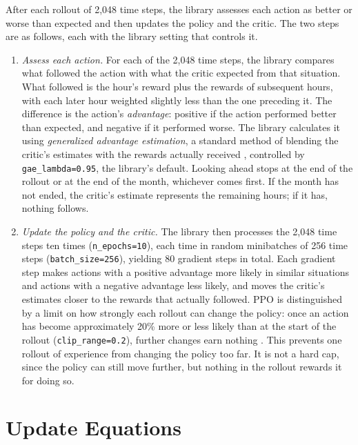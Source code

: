 \documentclass{UNCC-thesis}
\begin{document}
After each rollout of 2,048 time steps, the library assesses each action as better or worse
than expected and then updates the policy and the critic. The two steps are as follows, each
with the library setting that controls it.
\begin{enumerate}
  \item \emph{Assess each action.} For each of the 2,048 time steps, the library compares
        what followed the action with what the critic expected from that situation. What
        followed is the hour's reward plus the rewards of subsequent hours, with each later
        hour weighted slightly less than the one preceding it. The difference is the action's
        \emph{advantage}: positive if the action performed better than expected, and negative
        if it performed worse. The library calculates it using \emph{generalized advantage
        estimation}, a standard method of blending the critic's estimates with the rewards
        actually received \cite{schulman2016gae}, controlled by \texttt{gae\_lambda=0.95}, the
        library's default. Looking ahead stops at the end of the rollout or at the end of
        the month, whichever comes first. If the month has not ended, the critic's estimate
        represents the remaining hours; if it has, nothing follows.
  \item \emph{Update the policy and the critic.} The library then processes the 2,048 time
        steps ten times (\texttt{n\_epochs=10}), each time in random minibatches of 256 time
        steps (\texttt{batch\_size=256}), yielding 80 gradient steps in total. Each gradient
        step makes actions with a positive advantage more likely in similar situations and actions
        with a negative advantage less likely, and moves the critic's estimates closer to the
        rewards that actually followed. PPO is distinguished by a limit on how strongly each
        rollout can change the policy: once an action has become approximately 20\% more or less
        likely than at the start of the rollout (\texttt{clip\_range=0.2}), further changes earn
        nothing \cite{schulman2017ppo}. This prevents one rollout of experience from changing the
        policy too far. It is not a hard cap, since the policy can still move further, but
        nothing in the rollout rewards it for doing so.
\end{enumerate}

\section{Update Equations}
\end{document}
